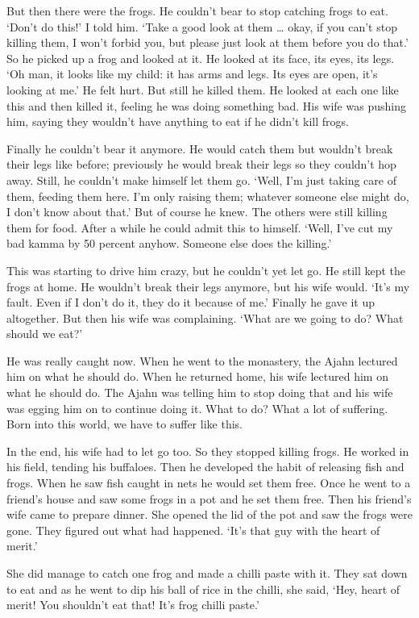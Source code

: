 But then there were the frogs. He couldn't bear to stop catching frogs to eat. `Don't do this!' I told him. `Take a good look at them \ldots{} okay, if you can't stop killing them, I won't forbid you, but please just look at them before you do that.' So he picked up a frog and looked at it. He looked at its face, its eyes, its legs. `Oh man, it looks like my child: it has arms and legs. Its eyes are open, it's looking at me.' He felt hurt. But still he killed them. He looked at each one like this and then killed it, feeling he was doing something bad. His wife was pushing him, saying they wouldn't have anything to eat if he didn't kill frogs. 

Finally he couldn't bear it anymore. He would catch them but wouldn't break their legs like before; previously he would break their legs so they couldn't hop away. Still, he couldn't make himself let them go. `Well, I'm just taking care of them, feeding them here. I'm only raising them; whatever someone else might do, I don't know about that.' But of course he knew. The others were still killing them for food. After a while he could admit this to himself. `Well, I've cut my bad kamma by 50 percent anyhow. Someone else does the killing.' 

This was starting to drive him crazy, but he couldn't yet let go. He still kept the frogs at home. He wouldn't break their legs anymore, but his wife would. `It's my fault. Even if I don't do it, they do it because of me.' Finally he gave it up altogether. But then his wife was complaining. `What are we going to do? What should we eat?' 

He was really caught now. When he went to the monastery, the Ajahn lectured him on what he should do. When he returned home, his wife lectured him on what he should do. The Ajahn was telling him to stop doing that and his wife was egging him on to continue doing it. What to do? What a lot of suffering. Born into this world, we have to suffer like this. 

In the end, his wife had to let go too. So they stopped killing frogs. He worked in his field, tending his buffaloes. Then he developed the habit of releasing fish and frogs. When he saw fish caught in nets he would set them free. Once he went to a friend's house and saw some frogs in a pot and he set them free. Then his friend's wife came to prepare dinner. She opened the lid of the pot and saw the frogs were gone. They figured out what had happened. `It's that guy with the heart of merit.' 

She did manage to catch one frog and made a chilli paste with it. They sat down to eat and as he went to dip his ball of rice in the chilli, she said, `Hey, heart of merit! You shouldn't eat that! It's frog chilli paste.' 

